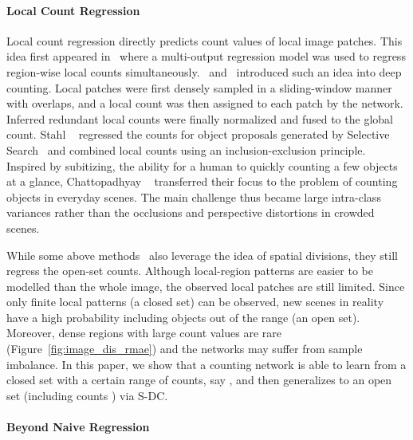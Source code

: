 \documentclass[10pt,twocolumn,letterpaper]{article}
\begin{document}
	\paragraph{Local Count Regression}
	Local count regression directly predicts count values of local image patches. This idea first appeared in~\cite{chen2012feature} where a multi-output regression model was used to regress region-wise local counts simultaneously.~\cite{Count_ception_2017_ICCVW} and~\cite{Lu2017TasselNet} introduced such an idea into deep counting. Local patches were first densely sampled in a sliding-window manner with overlaps, and a local count was then assigned to each patch by the network. Inferred redundant local counts were finally normalized and fused to the global count. Stahl \etal~\cite{tip2019divide} regressed the counts for object proposals generated by Selective Search~\cite{Uijlings2013Selective} and combined local counts using an inclusion-exclusion principle. Inspired by subitizing, the ability for a human to quickly counting a few objects at a glance, Chattopadhyay \etal~\cite{Count_everyday_2017_CVPR} transferred their focus to the problem of counting objects in everyday scenes. The main challenge thus became large intra-class variances rather than the occlusions and perspective distortions in crowded scenes.
	


	While some above methods~\cite{Count_everyday_2017_CVPR,tip2019divide} also leverage the idea of spatial divisions, they still regress the open-set counts. Although local-region patterns are easier to be modelled than the whole image, the observed local patches are still limited. Since only finite local patterns (a closed set) can be observed, new scenes in reality have a high probability including objects out of the range (an open set). Moreover, dense regions with large count values are rare (Figure~\ref{fig:image_dis_rmae}) and the networks may suffer from sample imbalance. In this paper, we show that a counting network is able to learn from a closed set with a certain range of counts, say , and then generalizes to an open set (including counts ) via S-DC. 
	


	\vspace{-10pt}
	\paragraph{Beyond Naive Regression}
	
\end{document}
